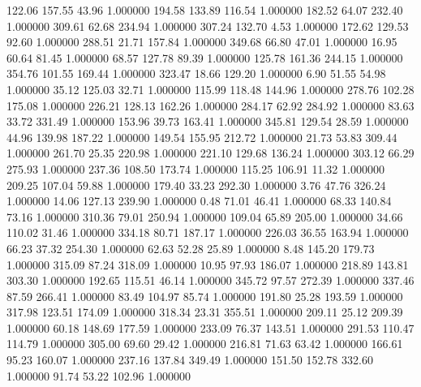     122.06    157.55     43.96  1.000000
    194.58    133.89    116.54  1.000000
    182.52     64.07    232.40  1.000000
    309.61     62.68    234.94  1.000000
    307.24    132.70      4.53  1.000000
    172.62    129.53     92.60  1.000000
    288.51     21.71    157.84  1.000000
    349.68     66.80     47.01  1.000000
     16.95     60.64     81.45  1.000000
     68.57    127.78     89.39  1.000000
    125.78    161.36    244.15  1.000000
    354.76    101.55    169.44  1.000000
    323.47     18.66    129.20  1.000000
      6.90     51.55     54.98  1.000000
     35.12    125.03     32.71  1.000000
    115.99    118.48    144.96  1.000000
    278.76    102.28    175.08  1.000000
    226.21    128.13    162.26  1.000000
    284.17     62.92    284.92  1.000000
     83.63     33.72    331.49  1.000000
    153.96     39.73    163.41  1.000000
    345.81    129.54     28.59  1.000000
     44.96    139.98    187.22  1.000000
    149.54    155.95    212.72  1.000000
     21.73     53.83    309.44  1.000000
    261.70     25.35    220.98  1.000000
    221.10    129.68    136.24  1.000000
    303.12     66.29    275.93  1.000000
    237.36    108.50    173.74  1.000000
    115.25    106.91     11.32  1.000000
    209.25    107.04     59.88  1.000000
    179.40     33.23    292.30  1.000000
      3.76     47.76    326.24  1.000000
     14.06    127.13    239.90  1.000000
      0.48     71.01     46.41  1.000000
     68.33    140.84     73.16  1.000000
    310.36     79.01    250.94  1.000000
    109.04     65.89    205.00  1.000000
     34.66    110.02     31.46  1.000000
    334.18     80.71    187.17  1.000000
    226.03     36.55    163.94  1.000000
     66.23     37.32    254.30  1.000000
     62.63     52.28     25.89  1.000000
      8.48    145.20    179.73  1.000000
    315.09     87.24    318.09  1.000000
     10.95     97.93    186.07  1.000000
    218.89    143.81    303.30  1.000000
    192.65    115.51     46.14  1.000000
    345.72     97.57    272.39  1.000000
    337.46     87.59    266.41  1.000000
     83.49    104.97     85.74  1.000000
    191.80     25.28    193.59  1.000000
    317.98    123.51    174.09  1.000000
    318.34     23.31    355.51  1.000000
    209.11     25.12    209.39  1.000000
     60.18    148.69    177.59  1.000000
    233.09     76.37    143.51  1.000000
    291.53    110.47    114.79  1.000000
    305.00     69.60     29.42  1.000000
    216.81     71.63     63.42  1.000000
    166.61     95.23    160.07  1.000000
    237.16    137.84    349.49  1.000000
    151.50    152.78    332.60  1.000000
     91.74     53.22    102.96  1.000000
